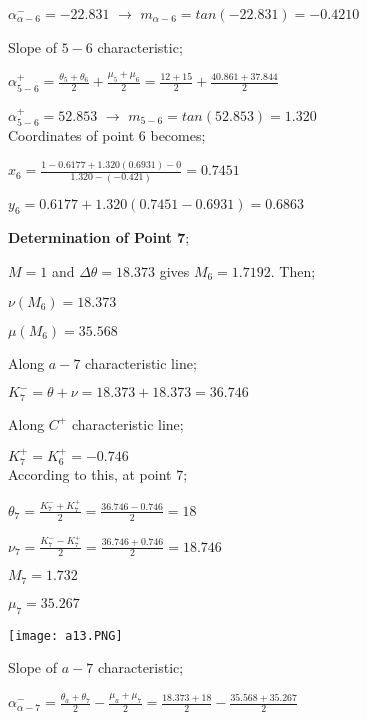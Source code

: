 \begin{appendices}
${\alpha}_{\alpha-6}^{-} = -22.831 $ $\rightarrow$   $m_{\alpha-6} = tan(-22.831) = -0.4210$

Slope of $5-6$ characteristic;

${\alpha}^{+}_{5-6} = \frac{\theta_5+\theta_6}{2}+\frac{\mu_5+\mu_6}{2} = \frac{12+15}{2}+\frac{40.861+37.844}{2}$

${\alpha}_{5-6}^{+} = 52.853 $ $\rightarrow$   $m_{5-6} = tan(52.853) = 1.320$\\

Coordinates of point $6$ becomes;\\

{\color{magenta}
	$x_6 = \frac{1-0.6177+1.320(0.6931)-0}{1.320-(-0.421)} = 0.7451 $
	
	$y_6 = 0.6177+1.320(0.7451-0.6931)=0.6863$
}

\pagebreak

\noindent\textbf{Determination of Point 7};\\

\begin{minipage}{0.65\textwidth}
	
	$M=1$ and $\Delta\theta = 18.373$ gives $M_6=1.7192$. Then;
	
	$\nu(M_6)=18.373$
	
	$\mu(M_6)=35.568$
	
	Along $a-7$ characteristic line;
	
	$K_7^- = \theta + \nu = 18.373 + 18.373 = 36.746$
	
	Along $C^+$ characteristic line;
	
	$K_7^+ = K_6^+ = -0.746$\\
	
	According to this, at point $7$;
	
	$\theta_7 = \frac{K_7^-+K_7^+}{2} = \frac{36.746-0.746}{2} = 18$
	
	$\nu_7 = \frac{K_7^--K_7^+}{2} = \frac{36.746+0.746}{2} = 18.746$
	
	$M_7 = 1.732$
	
	$\mu_7 = 35.267$\\
	
\end{minipage}
\begin{minipage}{0.35\textwidth}
	\texttt{[image: a13.PNG]}
\end{minipage}%
\noindent

Slope of $a-7$ characteristic;

${\alpha}^{-}_{\alpha-7} = \frac{\theta_a+\theta_7}{2}-\frac{\mu_a+\mu_7}{2} = \frac{18.373+18}{2}-\frac{35.568+35.267}{2}$


\end{appendices}
